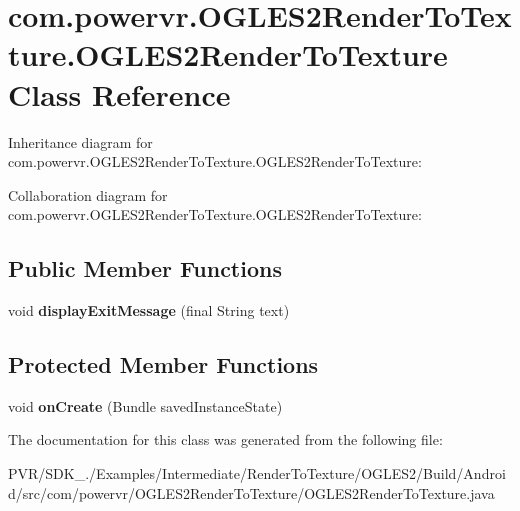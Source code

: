 \hypertarget{classcom_1_1powervr_1_1_o_g_l_e_s2_render_to_texture_1_1_o_g_l_e_s2_render_to_texture}{\section{com.\+powervr.\+O\+G\+L\+E\+S2\+Render\+To\+Texture.\+O\+G\+L\+E\+S2\+Render\+To\+Texture Class Reference}
\label{classcom_1_1powervr_1_1_o_g_l_e_s2_render_to_texture_1_1_o_g_l_e_s2_render_to_texture}
}


Inheritance diagram for com.\+powervr.\+O\+G\+L\+E\+S2\+Render\+To\+Texture.\+O\+G\+L\+E\+S2\+Render\+To\+Texture\+:


Collaboration diagram for com.\+powervr.\+O\+G\+L\+E\+S2\+Render\+To\+Texture.\+O\+G\+L\+E\+S2\+Render\+To\+Texture\+:
\subsection*{Public Member Functions}
\begin{DoxyCompactItemize}
\item 
\hypertarget{classcom_1_1powervr_1_1_o_g_l_e_s2_render_to_texture_1_1_o_g_l_e_s2_render_to_texture_a8cf5d7422fd8ab851c84e7b0ff3afa58}{void {\bfseries display\+Exit\+Message} (final String text)}\label{classcom_1_1powervr_1_1_o_g_l_e_s2_render_to_texture_1_1_o_g_l_e_s2_render_to_texture_a8cf5d7422fd8ab851c84e7b0ff3afa58}

\end{DoxyCompactItemize}
\subsection*{Protected Member Functions}
\begin{DoxyCompactItemize}
\item 
\hypertarget{classcom_1_1powervr_1_1_o_g_l_e_s2_render_to_texture_1_1_o_g_l_e_s2_render_to_texture_a501856212befb15cfe9f86e7afc485db}{void {\bfseries on\+Create} (Bundle saved\+Instance\+State)}\label{classcom_1_1powervr_1_1_o_g_l_e_s2_render_to_texture_1_1_o_g_l_e_s2_render_to_texture_a501856212befb15cfe9f86e7afc485db}

\end{DoxyCompactItemize}


The documentation for this class was generated from the following file\+:\begin{DoxyCompactItemize}
\item 
P\+V\+R/\+S\+D\+K\+\_./\+Examples/\+Intermediate/\+Render\+To\+Texture/\+O\+G\+L\+E\+S2/\+Build/\+Android/src/com/powervr/\+O\+G\+L\+E\+S2\+Render\+To\+Texture/O\+G\+L\+E\+S2\+Render\+To\+Texture.\+java\end{DoxyCompactItemize}
